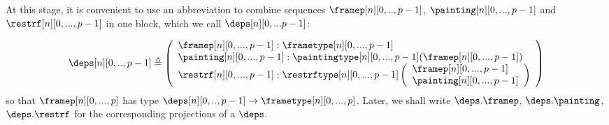 \documentclass{msc}
\newcommand{\defeq}{\ensuremath{\triangleq}}
\begin{document}
At this stage, it is convenient to use an abbreviation to combine sequences $\framep[n][0,..,p-1]$, $\painting[n][0,...,p-1]$ and $\restrf[n][0,...,p-1]$ in one block, which we call $\deps[n][0,...p-1]$:

\begin{align*}
  \deps[n][0,..,p-1] \defeq
  \left(\begin{array}{l}
            \framep[n][0,...,p-1] :\frametype[n][0,...,p-1] \\
            \painting[n][0,...,p-1] :\paintingtype[n][0,...,p-1]
            (\framep[n][0,...,p-1])                         \\
            \restrf[n][0,...,p-1]  :\restrftype[n][0,...,p-1]
            \left(\begin{array}{l}
                \framep[n][0,...,p-1]   \\
                \painting[n][0,...,p-1] \\
              \end{array}\right)                   \\
          \end{array}\right)
\end{align*}
so that $\framep[n][0,...,p]$ has type $\deps[n][0,..,p-1] \rightarrow \frametype[n][0,...,p]$. Later, we shall write $\deps.\framep$, $\deps.\painting$, $\deps.\restrf$ for the corresponding projections of a $\deps$.
\end{document}
